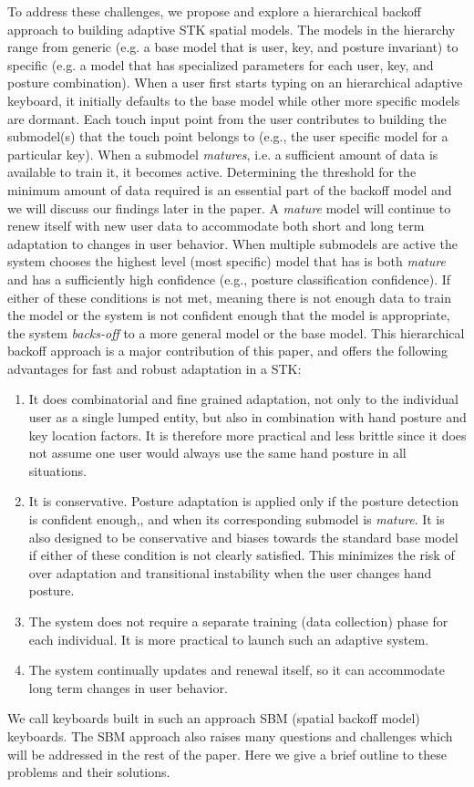 \documentclass{sigchi}
\begin{document}
To address these challenges, we propose and explore a hierarchical backoff approach to building adaptive STK spatial models. The models in the hierarchy range from generic (e.g. a base model that is user, key, and posture invariant) to specific (e.g. a model that has specialized parameters for each user, key, and posture combination). When a user first starts typing on an hierarchical adaptive keyboard, it initially defaults to the base model while other more specific models are dormant. Each touch input point from the user contributes to building the submodel(s) that the touch point belongs to (e.g., the user specific model for a particular key). When a submodel \textit{matures}, i.e. a sufficient amount of data is available to train it, it becomes active. Determining the threshold for the minimum amount of data required is an essential part of the backoff model and we will discuss our findings later in the paper.
A \textit{mature} model will continue to renew itself with new user data to accommodate  both short and long term adaptation to changes in user behavior. When multiple submodels are active the system chooses the highest level (most specific) model that has is both \textit{mature} and has a sufficiently high confidence (e.g., posture classification confidence). If either of these conditions is not met, meaning there is not enough data to train the model or the system is not confident enough that the model is appropriate, the system \textit{backs-off} to a more general model or the base model. This hierarchical backoff approach is a major contribution of this paper, and offers the following advantages for fast and robust adaptation in a STK:
\begin{enumerate}
\item It does combinatorial and fine grained adaptation, not only to the individual user as a single lumped entity, but also in combination with hand posture and key location factors. It is therefore more practical and less brittle since it does not assume one user would always use the same hand posture in all situations.

\item It is conservative. Posture adaptation is applied only if the posture detection is confident enough,, and when its corresponding submodel is \textit{mature}. It is also designed to be conservative and biases towards the standard base model if either of these condition is not clearly satisfied. This minimizes the risk of over adaptation and transitional instability when the user changes hand posture. 
 
\item The system does not require a separate training (data collection) phase for each individual. It is more practical to launch such an adaptive system.

\item The system continually updates and renewal itself, so it can accommodate long term changes in user behavior. 
\end{enumerate}
We call keyboards built in such an approach SBM (spatial backoff model) keyboards. The SBM approach also raises many questions and challenges which will be addressed in the rest of the paper. Here we give a brief outline to these problems and their solutions.
\end{document}
